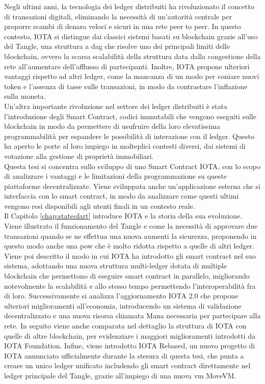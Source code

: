 \documentclass[12pt,a4paper,openright,twoside]{report}
\begin{document}
Negli ultimi anni, la tecnologia dei ledger distribuiti ha rivoluzionato il concetto di transazioni digitali, eliminando la necessità di un’autorità centrale per proporre scambi di denaro veloci e sicuri in una rete peer to peer. In questo contesto, IOTA si distingue dai classici sistemi basati su blockchain grazie all’uso del Tangle, una struttura a \acrfull{dag} che risolve uno dei principali limiti delle blockchain, ovvero la scarsa scalabilità della struttura data dalla congestione della rete all’aumentare dell’afflusso di partecipanti. Inoltre, IOTA propone ulteriori vantaggi rispetto ad altri ledger, come la mancanza di un modo per coniare nuovi token e l'assenza di tasse sulle transazioni, in modo da contrastare l'inflazione sulla moneta.\\
Un'altra importante rivoluzione nel settore dei ledger distribuiti è stata l'introduzione degli Smart Contract, codici immutabili che vengono eseguiti sulle blockchain in modo da permettere di usufruire della loro elevatissima programmabilità per espandere le possibilità di interazione con il ledger. Questo ha aperto le porte al loro impiego in molteplici contesti diversi, dai sistemi di votazione alla gestione di proprietà immobiliari.\\ 
Questa tesi si concentra sullo sviluppo di uno Smart Contract IOTA, con lo scopo di analizzare i vantaggi e le limitazioni della programmazione su queste piattaforme decentralizzate. Viene sviluppata anche un'applicazione esterna che si interfaccia con lo smart contract, in modo da analizzare come questi ultimi vengono resi disponibili agli utenti finali in un contesto reale.\\
Il Capitolo \ref{chap:stateofart} introduce IOTA e la storia della sua evoluzione. Viene illustrato il funzionamento del Tangle e come la necessità di approvare due transazioni quando se ne effettua una nuova aumenti la sicurezza, proponendo in questo modo anche una \acrlong{pow} che è molto ridotta rispetto a quelle di altri ledger. Viene poi descritto il modo in cui IOTA ha introdotto gli smart contract nel suo sistema, adottando una nuova struttura multi-ledger dotata di multiple blockchain che permettono di eseguire smart contract in parallelo, migliorando notevolmente la scalabilità e allo stesso tempo permettendo l'interoperabilità fra di loro. Successivamente si analizza l'aggiornamento IOTA 2.0 che propone ulteriori miglioramenti all'economia, introducendo un sistema di validazione decentralizzato e una nuova risorsa chiamata Mana necessaria per partecipare alla rete. In seguito viene anche comparata nel dettaglio la struttura di IOTA con quelle di altre blockchain, per evidenziare i maggiori miglioramenti introdotti da IOTA Foundation. Infine, viene introdotto IOTA Rebased, un nuovo progetto di IOTA annunciato ufficialmente durante la stesura di questa tesi, che punta a creare un unico ledger unificato includendo gli smart contract direttamente nel ledger principale del Tangle, grazie all'impiego di una nuova \acrlong{vm} MoveVM.\\
\end{document}
